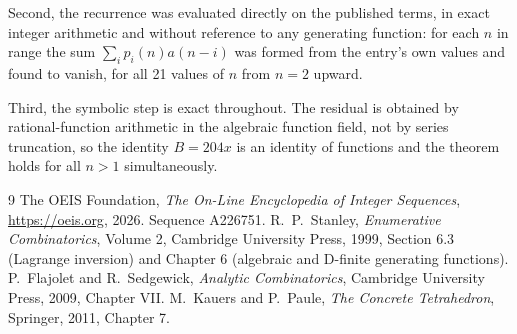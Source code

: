 \documentclass[11pt,a4paper]{article}
\theoremstyle{plain}
\theoremstyle{definition}
\begin{document}
Second, the recurrence was evaluated directly on the published terms, in exact integer
arithmetic and without reference to any generating function: for each $n$ in range the sum
$\sum_{i}p_{i}(n)a(n-i)$ was formed from the entry's own values and found to vanish, for
all 21 values of $n$ from $n=2$ upward.

Third, the symbolic step is exact throughout. The residual is obtained by
rational-function arithmetic in the algebraic function field, not by series truncation, so
the identity $B=204 x$ is an identity of functions and the theorem holds for all
$n>1$ simultaneously.

\begin{thebibliography}{9}
 The OEIS Foundation, \emph{The On-Line Encyclopedia of Integer Sequences},
\url{https://oeis.org}, 2026. Sequence A226751.
 R.~P.~Stanley, \emph{Enumerative Combinatorics}, Volume 2, Cambridge
University Press, 1999, Section 6.3 (Lagrange inversion) and Chapter 6 (algebraic and
D-finite generating functions).
 P.~Flajolet and R.~Sedgewick, \emph{Analytic Combinatorics}, Cambridge
University Press, 2009, Chapter VII.
 M.~Kauers and P.~Paule, \emph{The Concrete Tetrahedron}, Springer, 2011,
Chapter 7.
\end{thebibliography}
\end{document}
